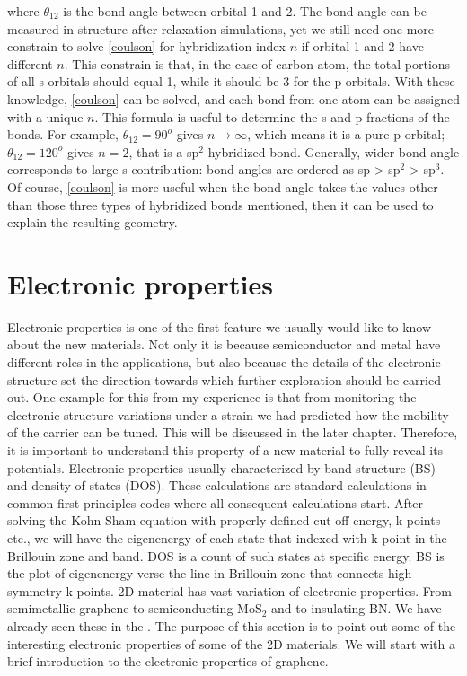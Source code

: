where $\theta_{12}$ is the bond angle between orbital 1 and 2. The bond angle can be measured in structure after relaxation simulations, yet we still need one more constrain to solve \autoref{coulson} for hybridization index $n$ if orbital 1 and 2 have different $n$. This constrain is that, in the case of carbon atom, the total portions of all s orbitals should equal 1, while it should be 3 for the p orbitals. With these knowledge, \autoref{coulson} can be solved, and each bond from one atom can be assigned with a unique $n$. This formula is useful to determine the s and p fractions of the bonds. For example, $\theta_{12}=90^o$ gives $n\rightarrow\infty$, which means it is a pure p orbital; $\theta_{12}=120^o$ gives $n=2$, that is a sp$^2$ hybridized bond. Generally, wider bond angle corresponds to large s contribution: bond angles are ordered as sp > sp$^2$ > sp$^3$. Of course, \autoref{coulson} is more useful when the bond angle takes the values other than those three types of hybridized bonds mentioned, then it can be used to explain the resulting geometry.


\section{Electronic properties}

Electronic properties is one of the first feature we usually would like to know about the new materials. Not only it is because semiconductor and metal have different roles in the applications, but also because the details of the electronic structure set the direction towards which further exploration should be carried out. One example for this from my experience is that from monitoring the electronic structure variations under a strain we had predicted how the mobility of the carrier can be tuned. This will be discussed in the later chapter. Therefore, it is important to understand this property of a new material to fully reveal its potentials. Electronic properties usually characterized by band structure (BS) and density of states (DOS). These calculations are standard calculations in common first-principles codes where all consequent calculations start. After solving the Kohn-Sham equation with properly defined cut-off energy, k points etc., we will have the eigenenergy of each state that indexed with k point in the Brillouin zone and band.  DOS is a count of such states at specific energy. BS is the plot of eigenenergy verse the line in Brillouin zone that connects high symmetry k points.  2D material has vast variation of electronic properties. From semimetallic graphene to semiconducting MoS$_2$ and to insulating BN. We have already seen these in the . The purpose of this section is to point out some of the interesting electronic properties of some of the 2D materials. We will start with a brief introduction to the electronic properties of graphene.

